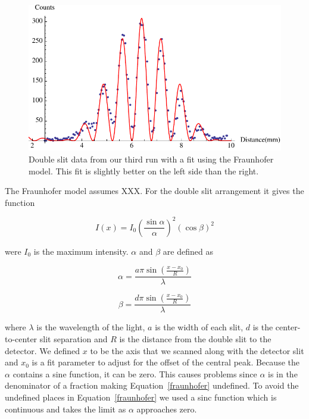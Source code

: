 \documentclass[prb,preprint]{revtex4-1}
\begin{document}
\begin{figure}[h!]
\centering
\includegraphics[width=6in]{doublefraun3.pdf}
\caption{Double slit data from our third run with a fit using the Fraunhofer model. This fit is slightly better on the left side than the right.}
\label{doublefraun3}
\end{figure}

The Fraunhofer model assumes XXX. For the double slit arrangement it gives the function

\begin{equation}
\label{fraunhofer}
I(x) = I_0 \left(\frac{\sin\alpha}{\alpha}\right)^2 \left(\cos\beta\right)^2
\end{equation}

were $I_0$ is the maximum intensity. $\alpha$ and $\beta$ are defined as

\begin{equation}
\label{alpha}
\alpha = \frac{a \pi \sin(\frac{x - x_0}{R})}{\lambda}
\end{equation}

\begin{equation}
\label{beta}
\beta = \frac{d \pi \sin(\frac{x - x_0}{R})}{\lambda}
\end{equation}

where $\lambda$ is the wavelength of the light, $a$ is the width of each slit, $d$ is the center-to-center slit separation and $R$ is the distance from the double slit to the detector. We defined $x$ to be the axis that we scanned along with the detector slit and $x_0$ is a fit parameter to adjust for the offset of the central peak.
Because the $\alpha$ contains a sine function, it can be zero. This causes problems since $\alpha$ is in the denominator of a fraction making Equation~\ref{fraunhofer} undefined. To avoid the undefined places in Equation~\ref{fraunhofer} we used a sinc function which is continuous and takes the limit as $\alpha$ approaches zero.
\end{document}
